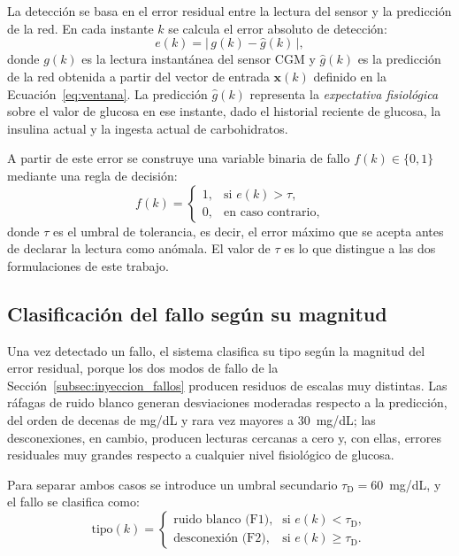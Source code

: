 \documentclass{report}
\begin{document}
La detección se basa en el error residual entre la lectura del sensor y la predicción de la red. En cada instante $k$ se calcula el error absoluto de detección:
\begin{equation}
\label{eq:error_deteccion}
e(k) = \big|\, g(k) - \hat{g}(k) \,\big|,
\end{equation}
donde $g(k)$ es la lectura instantánea del sensor CGM y $\hat{g}(k)$ es la predicción de la red obtenida a partir del vector de entrada $\mathbf{x}(k)$ definido en la Ecuación~\eqref{eq:ventana}. La predicción $\hat{g}(k)$ representa la \textit{expectativa fisiológica} sobre el valor de glucosa en ese instante, dado el historial reciente de glucosa, la insulina actual y la ingesta actual de carbohidratos.

A partir de este error se construye una variable binaria de fallo $f(k) \in \{0, 1\}$ mediante una regla de decisión:
\begin{equation}
\label{eq:regla_deteccion}
f(k) = 
\begin{cases}
1, & \text{si } e(k) > \tau, \\
0, & \text{en caso contrario,}
\end{cases}
\end{equation}
donde $\tau$ es el umbral de tolerancia, es decir, el error máximo que se acepta antes de declarar la lectura como anómala. El valor de $\tau$ es lo que distingue a las dos formulaciones de este trabajo.

\subsection*{Clasificación del fallo según su magnitud}
\label{subsec:clasificacion_fallos}

Una vez detectado un fallo, el sistema clasifica su tipo según la magnitud del error residual, porque los dos modos de fallo de la Sección~\ref{subsec:inyeccion_fallos} producen residuos de escalas muy distintas. Las ráfagas de ruido blanco generan desviaciones moderadas respecto a la predicción, del orden de decenas de mg/dL y rara vez mayores a 30~mg/dL; las desconexiones, en cambio, producen lecturas cercanas a cero y, con ellas, errores residuales muy grandes respecto a cualquier nivel fisiológico de glucosa.

Para separar ambos casos se introduce un umbral secundario $\tau_{\mathrm{D}} = 60$~mg/dL, y el fallo se clasifica como:
\begin{equation}
\label{eq:clasificacion_fallo}
\text{tipo}(k) = 
\begin{cases}
\text{ruido blanco (F1)}, & \text{si } e(k) < \tau_{\mathrm{D}}, \\
\text{desconexión (F2)}, & \text{si } e(k) \geq \tau_{\mathrm{D}}.
\end{cases}
\end{equation}
\end{document}
